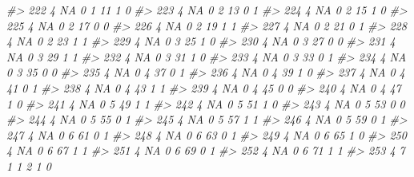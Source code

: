 \documentclass[]{book}
\newenvironment{Shaded}{\begin{snugshade}}{\end{snugshade}}
\newcommand{\CommentTok}[1]{\textcolor[rgb]{0.56,0.35,0.01}{\textit{#1}}}
\begin{document}
\begin{Shaded}
\begin{Highlighting}[]
\CommentTok{#> 222     4        NA         0     1    11           1            0}
\CommentTok{#> 223     4        NA         0     2    13           0            1}
\CommentTok{#> 224     4        NA         0     2    15           1            0}
\CommentTok{#> 225     4        NA         0     2    17           0            0}
\CommentTok{#> 226     4        NA         0     2    19           1            1}
\CommentTok{#> 227     4        NA         0     2    21           0            1}
\CommentTok{#> 228     4        NA         0     2    23           1            1}
\CommentTok{#> 229     4        NA         0     3    25           1            0}
\CommentTok{#> 230     4        NA         0     3    27           0            0}
\CommentTok{#> 231     4        NA         0     3    29           1            1}
\CommentTok{#> 232     4        NA         0     3    31           1            0}
\CommentTok{#> 233     4        NA         0     3    33           0            1}
\CommentTok{#> 234     4        NA         0     3    35           0            0}
\CommentTok{#> 235     4        NA         0     4    37           0            1}
\CommentTok{#> 236     4        NA         0     4    39           1            0}
\CommentTok{#> 237     4        NA         0     4    41           0            1}
\CommentTok{#> 238     4        NA         0     4    43           1            1}
\CommentTok{#> 239     4        NA         0     4    45           0            0}
\CommentTok{#> 240     4        NA         0     4    47           1            0}
\CommentTok{#> 241     4        NA         0     5    49           1            1}
\CommentTok{#> 242     4        NA         0     5    51           1            0}
\CommentTok{#> 243     4        NA         0     5    53           0            0}
\CommentTok{#> 244     4        NA         0     5    55           0            1}
\CommentTok{#> 245     4        NA         0     5    57           1            1}
\CommentTok{#> 246     4        NA         0     5    59           0            1}
\CommentTok{#> 247     4        NA         0     6    61           0            1}
\CommentTok{#> 248     4        NA         0     6    63           0            1}
\CommentTok{#> 249     4        NA         0     6    65           1            0}
\CommentTok{#> 250     4        NA         0     6    67           1            1}
\CommentTok{#> 251     4        NA         0     6    69           0            1}
\CommentTok{#> 252     4        NA         0     6    71           1            1}
\CommentTok{#> 253     4         7         1     1     2           1            0}

\end{Highlighting}
\end{Shaded}
\end{document}
